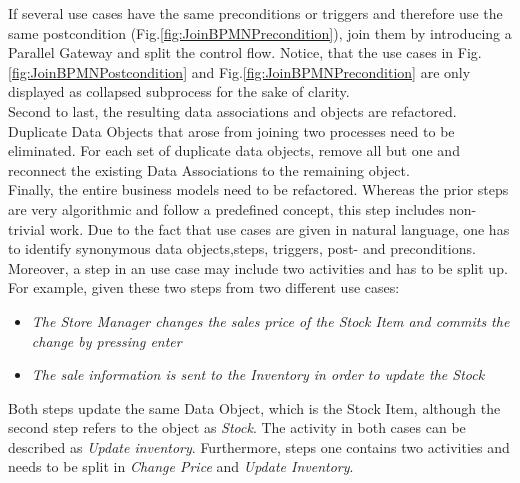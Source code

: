 \noindent
If several use cases have the same preconditions or triggers and therefore use the same postcondition (Fig.\ref{fig:JoinBPMNPrecondition}), join them by introducing a Parallel Gateway and split the control flow. Notice, that the use cases in Fig.\ref{fig:JoinBPMNPostcondition} and Fig.\ref{fig:JoinBPMNPrecondition} are only displayed as collapsed subprocess for the sake of clarity. \\
Second to last, the resulting data associations and objects are refactored. Duplicate Data Objects that arose from joining two processes need to be eliminated. For each set of duplicate data objects, remove all but one and reconnect the existing Data Associations to the remaining object. \\ 
Finally, the entire business models need to be refactored. Whereas the prior steps are very algorithmic and follow a predefined concept, this step includes non-trivial work. Due to the fact that use cases are given in natural language, one has to identify synonymous data objects,steps, triggers, post- and preconditions. Moreover, a step in an use case may include two activities and has to be split up. For example, given these two steps from two different use cases:
\begin{itemize}
	\item \textit{The Store Manager changes the sales price of the Stock Item and commits the change by pressing enter}
	\item \textit{The sale information is sent to the Inventory in order to update the Stock}
\end{itemize}
Both steps update the same Data Object, which is the Stock Item, although the second step refers to the object as \textit{Stock}. The activity in both cases can be described as \textit{Update inventory}. Furthermore, steps one contains two activities and needs to be split in \textit{Change Price} and \textit{Update Inventory}.


